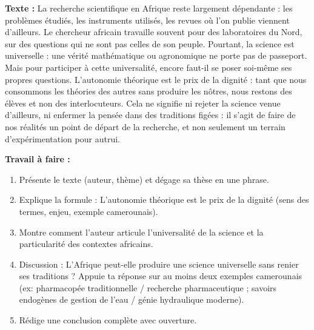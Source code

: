 \documentclass[11pt]{article}
\begin{document}
\begin{exercice}
\textbf{Texte :} \og La recherche scientifique en Afrique reste largement dépendante : les problèmes étudiés, les instruments utilisés, les revues où l'on publie viennent d'ailleurs. Le chercheur africain travaille souvent pour des laboratoires du Nord, sur des questions qui ne sont pas celles de son peuple. Pourtant, la science est universelle : une vérité mathématique ou agronomique ne porte pas de passeport. Mais pour participer à cette universalité, encore faut-il se poser soi-même ses propres questions. L'autonomie théorique est le prix de la dignité : tant que nous consommons les théories des autres sans produire les nôtres, nous restons des élèves et non des interlocuteurs. Cela ne signifie ni rejeter la science venue d'ailleurs, ni enfermer la pensée dans des traditions figées : il s'agit de faire de nos réalités un point de départ de la recherche, et non seulement un terrain d'expérimentation pour autrui. \fg

\textbf{Travail à faire :}
\begin{enumerate}
\item Présente le texte (auteur, thème) et dégage sa thèse en une phrase.
\item Explique la formule : \og L'autonomie théorique est le prix de la dignité \fg (sens des termes, enjeu, exemple camerounais).
\item Montre comment l'auteur articule l'universalité de la science et la particularité des contextes africains.
\item Discussion : L'Afrique peut-elle produire une science universelle sans renier ses traditions ? Appuie ta réponse sur au moins deux exemples camerounais (ex: pharmacopée traditionnelle / recherche pharmaceutique ; savoirs endogènes de gestion de l'eau / génie hydraulique moderne).
\item Rédige une conclusion complète avec ouverture.
\end{enumerate}
\end{exercice}
\end{document}
